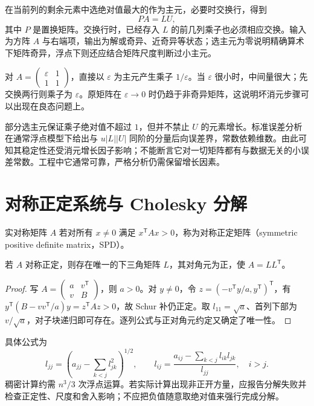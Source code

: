 \documentclass[UTF8,12pt,a4paper,fontset=fandol]{ctexbook}
\begin{document}
在当前列的剩余元素中选绝对值最大的作为主元，必要时交换行，得到
\begin{equation}
 PA=LU,
 \label{eq:na-plu}
\end{equation}
其中 $P$ 是置换矩阵。交换行时，已经存入 $L$ 的前几列乘子也必须相应交换。输入为方阵 $A$ 与右端项，输出为解或奇异、近奇异等状态；选主元为零说明精确算术下矩阵奇异，浮点下则还应结合矩阵尺度判断过小主元。

\begin{example}[小主元引起的中间量放大]
对 $A=\begin{pmatrix}\varepsilon&1\\1&1\end{pmatrix}$，直接以 $\varepsilon$ 为主元产生乘子 $1/\varepsilon$。当 $\varepsilon$ 很小时，中间量很大；先交换两行则乘子为 $\varepsilon$。原矩阵在 $\varepsilon\to0$ 时仍趋于非奇异矩阵，这说明坏消元步骤可以出现在良态问题上。
\end{example}

部分选主元保证乘子绝对值不超过 $1$，但并不禁止 $U$ 的元素增长。标准误差分析在通常浮点模型下给出与 $u|L||U|$ 同阶的分量后向误差界，常数依赖维数。由此可知其稳定性还受消元增长因子影响；不能断言它对一切矩阵都有与数据无关的小误差常数。工程中它通常可靠，严格分析仍需保留增长因素。

\section{对称正定系统与 Cholesky 分解}
\begin{definition}[对称正定矩阵]
实对称矩阵 $A$ 若对所有 $x\ne0$ 满足 $x^{\mathsf T}Ax>0$，称为对称正定矩阵（symmetric positive definite matrix，SPD）。
\end{definition}
\begin{theorem}[Cholesky 分解]
若 $A$ 对称正定，则存在唯一的下三角矩阵 $L$，其对角元为正，使 $A=LL^{\mathsf T}$。
\end{theorem}
\begin{proof}
写 $A=\begin{pmatrix}a&v^{\mathsf T}\\v&B\end{pmatrix}$，则 $a>0$。对 $y\ne0$，令 $z=(-v^{\mathsf T}y/a,y^{\mathsf T})^{\mathsf T}$，有 $y^{\mathsf T}(B-vv^{\mathsf T}/a)y=z^{\mathsf T}Az>0$，故 Schur 补仍正定。取 $l_{11}=\sqrt a$、首列下部为 $v/\sqrt a$，对子块递归即可存在。逐列公式与正对角元约定又确定了唯一性。
\end{proof}
具体公式为
\[
 l_{jj}=\left(a_{jj}-\sum_{k<j}l_{jk}^2\right)^{1/2},\qquad
 l_{ij}=\frac{a_{ij}-\sum_{k<j}l_{ik}l_{jk}}{l_{jj}},\quad i>j.
\]
稠密计算约需 $n^3/3$ 次浮点运算。若实际计算出现非正开方量，应报告分解失败并检查正定性、尺度和舍入影响；不应把负值随意取绝对值来强行完成分解。
\end{document}
